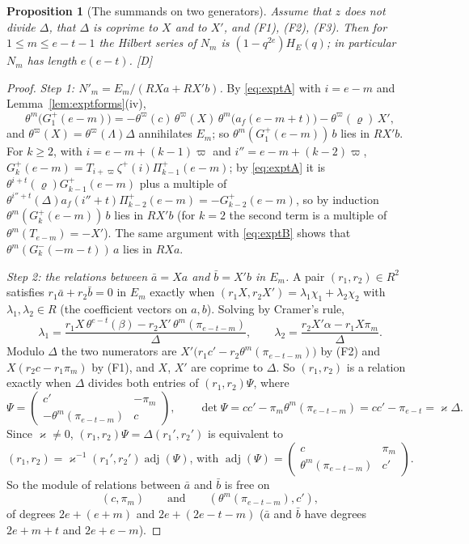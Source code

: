 \documentclass[11pt]{article}
\newtheorem{proposition}{Proposition}
\theoremstyle{definition}
\theoremstyle{remark}
\begin{document}
\begin{proposition}[The summands on two generators]\label{prop:expttwo}
Assume that $z$ does not divide $\Delta$, that $\Delta$ is coprime to $X$ and to $X'$, and (F1), (F2), (F3). Then for $1\le m\le e-t-1$ the Hilbert series of $N_m$ is $(1-q^{2e})H_E(q)$; in particular $N_m$ has length $e(e-t)$. [D]
\end{proposition}
\begin{proof}
\emph{Step 1: $N'_m=E_m/(RXa+RX'b)$.} By \eqref{eq:exptA} with $i=e-m$ and Lemma~\ref{lem:exptforms}(iv),
\[
\theta^m\bigl(G^+_1(e-m)\bigr)=-\theta^{\varpi}(c)\,\theta^{\varpi}(X)\,\theta^m\bigl(a_f(e-m+t)\bigr)-\theta^{\varpi}(\varrho)\,X',
\]
and $\theta^\varpi(X)=\theta^\varpi(\Lambda)\Delta$ annihilates $E_m$; so $\theta^m(G^+_1(e-m))\,b$ lies in $RX'b$. For $k\ge2$, with $i=e-m+(k-1)\varpi$ and $i''=e-m+(k-2)\varpi$, $G^+_k(e-m)=T_{i+\varpi}\zeta^+(i)\Pi^+_{k-1}(e-m)$; by \eqref{eq:exptA} it is $\theta^{i+t}(\varrho)G^+_{k-1}(e-m)$ plus a multiple of $\theta^{i''+t}(\Delta)a_f(i''+t)\Pi^+_{k-2}(e-m)=-G^+_{k-2}(e-m)$, so by induction $\theta^m(G^+_k(e-m))\,b$ lies in $RX'b$ (for $k=2$ the second term is a multiple of $\theta^m(T_{e-m})=-X'$). The same argument with \eqref{eq:exptB} shows that $\theta^m(G^-_k(-m-t))\,a$ lies in $RXa$.

\emph{Step 2: the relations between $\bar a=Xa$ and $\bar b=X'b$ in $E_m$.} A pair $(r_1,r_2)\in R^2$ satisfies $r_1\bar a+r_2\bar b=0$ in $E_m$ exactly when $(r_1X,r_2X')=\lambda_1\chi_1+\lambda_2\chi_2$ with $\lambda_1,\lambda_2\in R$ (the coefficient vectors on $a,b$). Solving by Cramer's rule,
\[
\lambda_1=\frac{r_1X\,\theta^{e-t}(\beta)-r_2X'\,\theta^m(\pi_{e-t-m})}{\Delta},\qquad
\lambda_2=\frac{r_2X'\alpha-r_1X\pi_m}{\Delta}.
\]
Modulo $\Delta$ the two numerators are $X'\bigl(r_1c'-r_2\theta^m(\pi_{e-t-m})\bigr)$ by (F2) and $X(r_2c-r_1\pi_m)$ by (F1), and $X$, $X'$ are coprime to $\Delta$. So $(r_1,r_2)$ is a relation exactly when $\Delta$ divides both entries of $(r_1,r_2)\Psi$, where
\[
\Psi=\begin{pmatrix}c'&-\pi_m\\-\theta^m(\pi_{e-t-m})&c\end{pmatrix},\qquad\det\Psi=cc'-\pi_m\theta^m(\pi_{e-t-m})=cc'-\pi_{e-t}=\varkappa\Delta.
\]
Since $\varkappa\ne0$, $(r_1,r_2)\Psi=\Delta(r_1',r_2')$ is equivalent to $(r_1,r_2)=\varkappa^{-1}(r_1',r_2')\operatorname{adj}(\Psi)$, with $\operatorname{adj}(\Psi)=\begin{pmatrix}c&\pi_m\\\theta^m(\pi_{e-t-m})&c'\end{pmatrix}$. So the module of relations between $\bar a$ and $\bar b$ is free on
\[
(c,\pi_m)\qquad\text{and}\qquad(\theta^m(\pi_{e-t-m}),c'),
\]
of degrees $2e+(e+m)$ and $2e+(2e-t-m)$ ($\bar a$ and $\bar b$ have degrees $2e+m+t$ and $2e+e-m$).


\end{proof}
\end{document}
